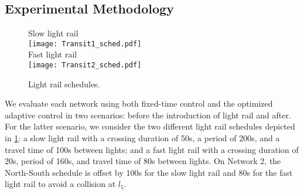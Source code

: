 %
% 
%


\subsection{Experimental Methodology}


\begin{figure}[t]
\centering
\scriptsize{Slow light rail}\\
\texttt{[image: Transit1\_sched.pdf]}\\
\scriptsize{Fast light rail}\\
\texttt{[image: Transit2\_sched.pdf]}
\caption{Light rail schedules.}
\label{fig:transits}
\end{figure}


We evaluate each network using both fixed-time control and the optimized
adaptive control in two scenarios: before the introduction of light rail and
after.
%
For the latter scenario, we consider the two different light rail schedules
depicted in \cref{fig:transits}:
%
a slow light rail with a crossing duration of 50s, a period of 200s, and a
travel time of 100s between lights;
%
and a fast light rail with a crossing duration of 20s, period of 160s, and
travel time of 80s between lights.
%
On Network 2, the North-South schedule is offset by 100s for the slow light rail
and 80s for the fast light rail to avoid a collision at $l_5$.



